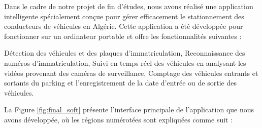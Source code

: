 Dans le cadre de notre projet de fin d'études, nous avons réalisé une application intelligente spécialement conçue pour gérer efficacement le stationnement des conducteurs de véhicules en Algérie.  
Cette application a été développée pour fonctionner sur un ordinateur portable et offre les fonctionnalités suivantes :
\begin{outline}[enumerate]
    \1 Détection des véhicules et des plaques d'immatriculation,
    \1 Reconnaissance des numéros d'immatriculation,
    \1 Suivi en temps réel des véhicules en analysant les vidéos provenant des caméras de surveillance,
    \1 Comptage des véhicules entrants et sortants du parking et l'enregistrement de la date d'entrée ou de sortie des véhicules.
\end{outline} 
La Figure \ref{fig:final_soft} présente l'interface principale de l'application que nous avons développée, où les régions numérotées sont expliquées comme suit :

